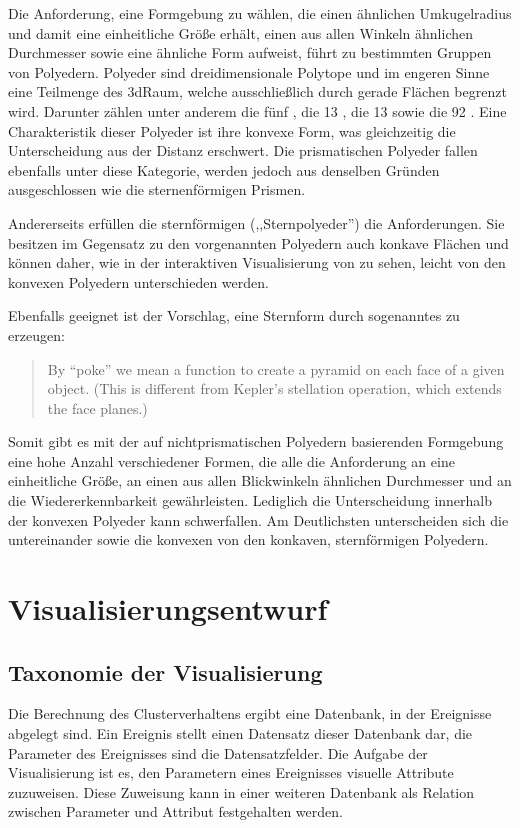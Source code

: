 Die Anforderung, eine Formgebung zu wählen, die einen ähnlichen Umkugelradius und damit eine einheitliche Größe erhält, einen aus allen Winkeln ähnlichen Durchmesser sowie eine ähnliche Form aufweist, führt zu bestimmten Gruppen von Polyedern. Polyeder sind dreidimensionale Polytope und im engeren Sinne eine Teilmenge des \gls{3dRaum}, welche ausschließlich durch gerade Flächen begrenzt wird. Darunter zählen unter anderem die fünf  \cite{RegularPolyhedra}, die 13 , die 13  sowie die 92  \cite{JohnsonPolyeder}. Eine Charakteristik dieser Polyeder ist ihre konvexe Form, was gleichzeitig die Unterscheidung aus der Distanz erschwert. Die prismatischen Polyeder fallen ebenfalls unter diese Kategorie, werden jedoch aus denselben Gründen ausgeschlossen wie die sternenförmigen Prismen.

Andererseits erfüllen die sternförmigen  (,,Sternpolyeder'') die Anforderungen. Sie besitzen im Gegensatz zu den vorgenannten Polyedern auch konkave Flächen \cite{KeplerPoinsotSolid} und können daher, wie in der interaktiven Visualisierung von \cite{WebGLUniformPolyhedra} zu sehen, leicht von den konvexen Polyedern unterschieden werden.

Ebenfalls geeignet ist der Vorschlag, eine Sternform durch sogenanntes  zu erzeugen: \blockcquote[4]{ProceduralGenerationofSculpturalForms}{By “poke” we mean a function to create a pyramid on each face of a given object. (This is different from Kepler’s stellation operation, which extends the face planes.)}

Somit gibt es mit der auf nichtprismatischen Polyedern basierenden Formgebung eine hohe Anzahl verschiedener Formen, die alle die Anforderung an eine einheitliche Größe, an einen aus allen Blickwinkeln ähnlichen Durchmesser und an die Wiedererkennbarkeit gewährleisten. Lediglich die Unterscheidung innerhalb der konvexen Polyeder kann schwerfallen. Am Deutlichsten unterscheiden sich die  untereinander sowie die konvexen von den konkaven, sternförmigen Polyedern.


\section{Visualisierungsentwurf}

\subsection{Taxonomie der Visualisierung}\label{sec:vis-taxonomie}
Die Berechnung des Clusterverhaltens ergibt eine Datenbank, in der Ereignisse abgelegt sind. Ein Ereignis stellt einen Datensatz dieser Datenbank dar, die Parameter des Ereignisses sind die Datensatzfelder. Die Aufgabe der Visualisierung ist es, den Parametern eines Ereignisses visuelle Attribute zuzuweisen. Diese Zuweisung kann in einer weiteren Datenbank als Relation %
zwischen Parameter und Attribut festgehalten werden.

